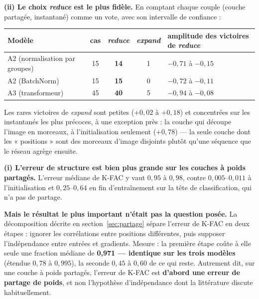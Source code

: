 \documentclass[11pt,a4paper]{article}
\newcommand{\eng}[1]{\emph{#1}}
\begin{document}
\begin{mesure}
\textbf{(ii) Le choix \eng{reduce} est le plus fidèle.} En comptant chaque couple (couche partagée,
instantané) comme un vote, avec son intervalle de confiance :

\begin{center}\small
\begin{tabular}{@{}lcccl@{}}
\toprule
Modèle & cas & \eng{reduce} & \eng{expand} & amplitude des victoires de \eng{reduce} \\
\midrule
A2 (normalisation par groupes) & 15 & \textbf{14} & 1 & $-0{,}71$ à $-0{,}15$ \\
A2 (BatchNorm) & 15 & \textbf{15} & 0 & $-0{,}72$ à $-0{,}11$ \\
A3 (transformeur) & 45 & \textbf{40} & 5 & $-0{,}94$ à $-0{,}08$ \\
\bottomrule
\end{tabular}
\end{center}

\noindent Les rares victoires de \eng{expand} sont petites ($+0{,}02$ à $+0{,}18$) et concentrées
sur les instantanés les plus précoces, à une exception près : la couche qui découpe l'image en
morceaux, à l'initialisation seulement ($+0{,}78$) — la seule couche dont les « positions » sont des
morceaux d'image disjoints plutôt qu'une séquence que le réseau agrège ensuite.

\medskip
\textbf{(i) L'erreur de structure est bien plus grande sur les couches à poids partagés.} L'erreur
médiane de K-FAC y vaut $0{,}95$ à $0{,}98$, contre $0{,}005$--$0{,}011$ à l'initialisation et
$0{,}25$--$0{,}64$ en fin d'entraînement sur la tête de classification, qui n'a pas de partage.
\end{mesure}

\textbf{Mais le résultat le plus important n'était pas la question posée.} La décomposition décrite
en section~\ref{sec:partage} sépare l'erreur de K-FAC en deux étapes : ignorer les corrélations entre positions
différentes, puis supposer l'indépendance entre entrées et gradients. Mesure : la première étape
coûte à elle seule une fraction médiane de \textbf{0,971 — identique sur les trois modèles} (étendue
$0{,}78$ à $0{,}995$), la seconde $0{,}45$ à $0{,}60$ de ce qui reste. Autrement dit, sur une couche
à poids partagés, l'erreur de K-FAC est \textbf{d'abord une erreur de partage de poids}, et non
l'hypothèse d'indépendance dont la littérature discute habituellement.
\end{document}
